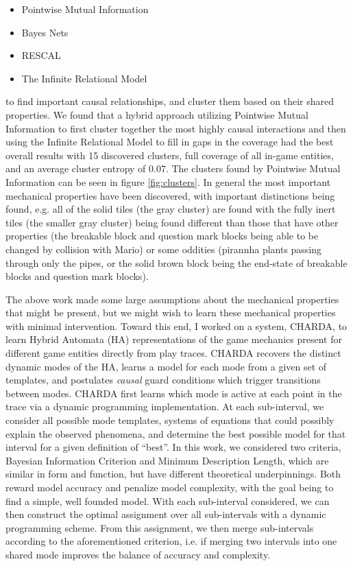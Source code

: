 \documentclass[a4paper]{article}
\begin{document}
\begin{itemize}
 \setlength\itemsep{0.1mm}
\item Pointwise Mutual Information
\item Bayes Nets
\item RESCAL
\item The Infinite Relational Model
\end{itemize}

to find important causal relationships, and cluster them based on their shared properties.  We found that a hybrid approach utilizing Pointwise Mutual Information to first cluster together the most highly causal interactions and then using the Infinite Relational Model to fill in gaps in the coverage had the best overall results with 15 discovered clusters, full coverage of all in-game entities, and an average cluster entropy of 0.07.  The clusters found by Pointwise Mutual Information can be seen in figure \ref{fig:clusters}.  In general the most important mechanical properties have been discovered, with important distinctions being found, e.g. all of the solid tiles (the gray cluster) are found with the fully inert tiles (the smaller gray cluster) being found different than those that have other properties (the breakable block and question mark blocks being able to be changed by collision with Mario) or some oddities (pirannha plants passing through only the pipes, or the solid brown block being the end-state of breakable blocks and question mark blocks).

The above work made some large assumptions about the mechanical properties that might be present, but we might wish to learn these mechanical properties with minimal intervention.  Toward this end, I worked on a system, CHARDA, to learn Hybrid Automata (HA) representations of the game mechanics present for different game entities directly from play traces.   CHARDA recovers the distinct dynamic modes of the HA, learns a model for each mode from a given set of templates, and postulates \textit{causal} guard conditions which trigger transitions between modes. CHARDA first learns which mode is active at each point in the trace via a dynamic programming implementation.  At each sub-interval, we consider all possible mode templates, systems of equations that could possibly explain the observed phenomena, and determine the best possible model for that interval for a given definition of ``best''.  In this work, we considered two criteria, Bayesian Information Criterion and Minimum Description Length, which are similar in form and function, but have different theoretical underpinnings.  Both reward model accuracy and penalize model complexity, with the goal being to find a simple, well founded model.  With each sub-interval considered, we can then construct the optimal assignment over all sub-intervals with a dynamic programming scheme.  From this assignment, we then merge sub-intervals according to the aforementioned criterion, i.e. if merging two intervals into one shared mode improves the balance of accuracy and complexity. 
\end{document}
